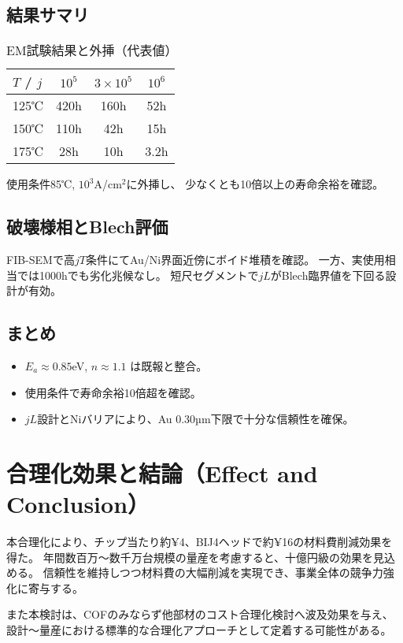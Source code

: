 \documentclass[onecolumn]{IEEEtran} %
\begin{document}
\subsection{結果サマリ}
\begin{table}[htbp]
  \centering
  \caption{EM試験結果と外挿（代表値）}
  \begin{tabular}{@{}lccc@{}}
    \toprule
    $T$ / $j$ & $10^5$ & $3\times 10^5$ & $10^6$ \\
    \midrule
    125℃ & 420h & 160h & 52h \\
    150℃ & 110h & 42h  & 15h \\
    175℃ & 28h  & 10h  & 3.2h \\
    \bottomrule
  \end{tabular}
\end{table}

使用条件85℃, $10^3$A/cm$^2$に外挿し、
少なくとも10倍以上の寿命余裕を確認。

\subsection{破壊様相とBlech評価}
FIB-SEMで高$jT$条件にてAu/Ni界面近傍にボイド堆積を確認。
一方、実使用相当では1000hでも劣化兆候なし。
短尺セグメントで$jL$がBlech臨界値を下回る設計が有効。

\subsection{まとめ}
\begin{itemize}
  \item $E_a\approx 0.85$eV, $n\approx1.1$ は既報と整合。
  \item 使用条件で寿命余裕10倍超を確認。
  \item $jL$設計とNiバリアにより、Au 0.30µm下限で十分な信頼性を確保。
\end{itemize}

\section{合理化効果と結論（Effect and Conclusion）}
本合理化により、チップ当たり約¥4、BIJ4ヘッドで約¥16の材料費削減効果を得た。
年間数百万～数千万台規模の量産を考慮すると、十億円級の効果を見込める。
信頼性を維持しつつ材料費の大幅削減を実現でき、事業全体の競争力強化に寄与する。

また本検討は、COFのみならず他部材のコスト合理化検討へ波及効果を与え、
設計～量産における標準的な合理化アプローチとして定着する可能性がある。
\end{document}
